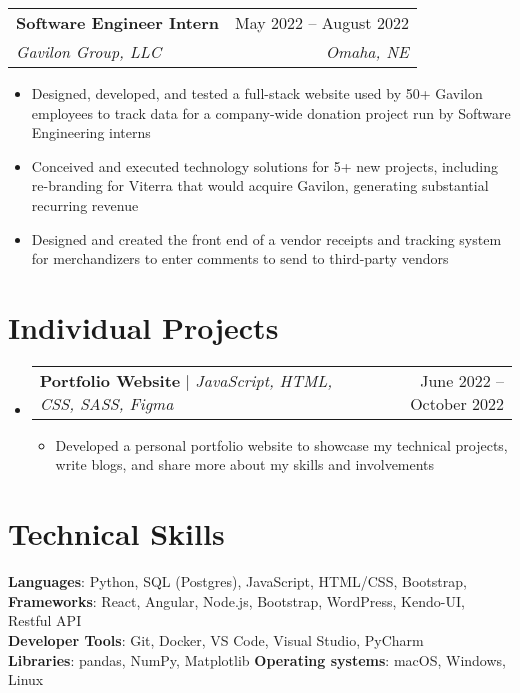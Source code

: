 \documentclass[letterpaper,11pt]{article}
\makeatletter
\newcommand{\resumeItem}[1]{
  \item\small{
    {#1 \vspace{-2pt}}
  }
}
\newcommand{\resumeSubheading}[4]{
  \vspace{2pt}\item
    \begin{tabular*}{0.97\textwidth}[t]{l@{\extracolsep{\fill}}r}
      \textbf{#1} & #2 \\
      \textit{\small#3} & \textit{\small #4} \\
    \end{tabular*}\vspace{7pt}
}
\newcommand{\resumeSubSubheading}[2]{
    \item
    \begin{tabular*}{0.97\textwidth}{l@{\extracolsep{\fill}}r}
      \textit{\small#1} & \textit{\small #2} \\
    \end{tabular*}\vspace{7pt}
}
\newcommand{\resumeProjectHeading}[2]{
    \item
    \begin{tabular*}{0.97\textwidth}{l@{\extracolsep{\fill}}r}
      \small#1 & #2 \\
    \end{tabular*}\vspace{7pt}
}
\newcommand{\resumeSubHeadingListStart}{\begin{itemize}[leftmargin=0.15in, label={}]}
\newcommand{\resumeSubHeadingListEnd}{\end{itemize}}
\newcommand{\resumeItemListStart}{\begin{itemize}}
\newcommand{\resumeItemListEnd}{\end{itemize}\vspace{-5pt}}
\makeatother
\begin{document}

    \resumeSubheading
      {Software Engineer Intern}{May 2022 -- August 2022}
      {Gavilon Group, LLC}{Omaha, NE}
      \resumeItemListStart
        \resumeItem{Designed, developed, and tested a full-stack website used by 50+ Gavilon employees to track data for a company-wide donation project run by Software Engineering interns}
        \resumeItem{Conceived and executed technology solutions for 5+ new projects, including re-branding for Viterra that would acquire Gavilon, generating substantial recurring revenue}
        \resumeItem{Designed and created the front end of a vendor receipts and tracking system for merchandizers to enter comments to send to third-party vendors }
    \resumeItemListEnd




\section{Individual Projects}
    \resumeSubHeadingListStart
      \resumeProjectHeading
          {\textbf{Portfolio Website} $|$ \emph{JavaScript, HTML, CSS, SASS, Figma}}{June 2022 -- October 2022}
          \resumeItemListStart
            \resumeItem{Developed a personal portfolio website to showcase my technical projects, write blogs, and share more about my skills and involvements}
            
          \resumeItemListEnd
      
    \resumeSubHeadingListEnd



%
\section{Technical Skills}
 \begin{itemize}[leftmargin=0.15in, label={}]
    \small{\item{
     \textbf{Languages}{: Python, SQL (Postgres), JavaScript, HTML/CSS, Bootstrap, } \\
     \textbf{Frameworks}{: React, Angular, Node.js, Bootstrap, WordPress, Kendo-UI, Restful API} \\
     \textbf{Developer Tools}{: Git, Docker, VS Code, Visual Studio, PyCharm} \\
     \textbf{Libraries}{: pandas, NumPy, Matplotlib}
     \textbf{Operating systems}{: macOS, Windows, Linux}
    }}
 \end{itemize}


\end{document}
